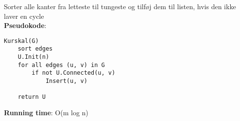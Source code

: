 Sorter alle kanter fra letteste til tungeste og tilføj dem til listen, hvis den ikke laver en cycle\\
\textbf{Pseudokode}:
\begin{lstlisting}[frame=single, mathescape=true]
Kurskal(G)
	sort edges
	U.Init(n)
	for all edges (u, v) in G
		if not U.Connected(u, v)
			Insert(u, v)
	
	return U
\end{lstlisting}
\textbf{Running time}: O(m log n)
